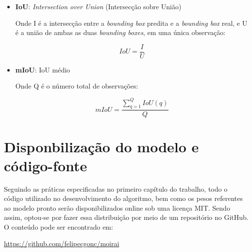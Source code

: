 \documentclass[]{politex}
\begin{document}
\begin{itemize}
    \item \textbf{IoU}: \textit{Intersection over Union} (Intersecção sobre União)
    
    Onde I é a intersecção entre a \textit{bounding box} predita e a \textit{bounding box} real, e U é a união de ambas as duas \textit{bounding boxes}, em uma única observação:
    
    \begin{equation}
    IoU = \frac{I}{U}
    \end{equation}
    
    \item \textbf{mIoU}: IoU médio
    
    Onde Q é o número total de observações:
    
    \begin{equation}
        mIoU = \frac{\sum_{q=1}^{Q} IoU(q)}{Q}
    \end{equation}
    
\end{itemize}

\chapter{Disponbilização do modelo e código-fonte}

Seguindo as práticas especificadas no primeiro capítulo do trabalho, todo o código utilizado no desenvolvimento do algoritmo, bem como os pesos referentes ao modelo pronto serão disponibilizados online sob uma licença MIT. Sendo assim, optou-se por fazer essa distribuição por meio de um repositório no GitHub. O conteúdo pode ser encontrado em:

\center\url{https://github.com/felipecgonc/moirai}
\end{document}
